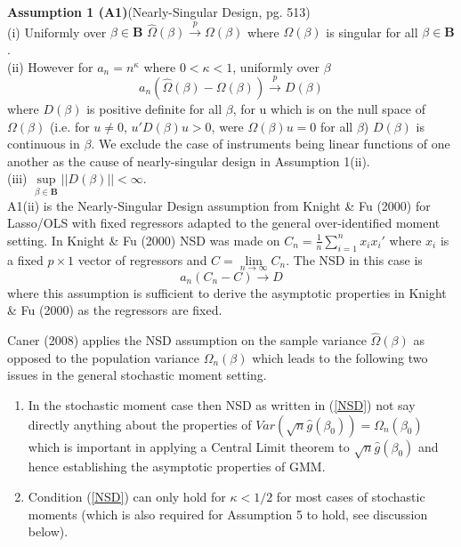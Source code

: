 \documentclass[11pt, fleqn]{article}
\begin{document}
\textbf{Assumption 1 (A1)}(Nearly-Singular Design, pg. 513)\\
(i) Uniformly over $\beta \in \mathbf{B}$ $\hat{\Omega}(\beta)\overset{p}{\rightarrow} \Omega(\beta)$ where $\Omega(\beta)$ is singular for all $\beta \in \mathbf{B}$.\\
(ii) However for $a_n=n^{\kappa}$ where $0<\kappa<1$, uniformly over $\beta$
\begin{equation} \label{NSD} a_n(\hat{\Omega}(\beta)-\Omega(\beta))\overset{p}{\rightarrow}D(\beta)\end{equation}
where $D(\beta)$ is positive definite for all $\beta$,  for u which is on the null space of $\Omega(\beta)$ (i.e. for $u\neq 0$, $u'D(\beta)u>0$, were $\Omega(\beta)u=0$ for all $\beta$) $D(\beta)$ is continuous in $\beta$. We exclude the case of instruments being linear functions of one another as the cause of nearly-singular design in Assumption 1(ii).\\
(iii) $\underset{\beta \in \mathbf{B}}{\sup} |\!| D(\beta)|\!|<\infty$.\\


  A1(ii) is the Nearly-Singular Design assumption  from Knight \& Fu (2000) for Lasso/OLS with fixed regressors adapted to the general over-identified moment setting. In Knight \& Fu (2000) NSD was made on $C_n=\frac{1}{n}\sum_{i=1}^nx_i x_i'$ where $x_i$ is a fixed $p\times 1$ vector of regressors and $C=\underset{n\rightarrow \infty}{\lim}C_n$. The NSD in this case is
 \begin{equation} a_n(C_n-C)\rightarrow D\end{equation}
where this assumption is sufficient to derive the asymptotic properties in Knight \& Fu (2000) as the regressors are fixed.
 
 
   Caner (2008)  applies the NSD assumption on the sample variance $\hat{\Omega}(\beta)$ as opposed to the population variance $\Omega_n(\beta)$ which leads to the following  two issues in the general stochastic moment setting.
 \begin{enumerate}
   \item In the stochastic moment case  then NSD as written in (\ref{NSD})  not say directly anything about the properties of $Var(\sqrt{n}\hat{g}(\beta_0))=\Omega_n(\beta_0)$ which is important in applying a Central Limit theorem to $\sqrt{n}\hat{g}(\beta_0)$ and hence establishing the asymptotic properties of GMM.
       \item  Condition (\ref{NSD}) can only hold for $\kappa<1/2$ for most cases of stochastic moments (which is also required for Assumption 5 to hold, see  discussion below).
 \end{enumerate}
\end{document}
